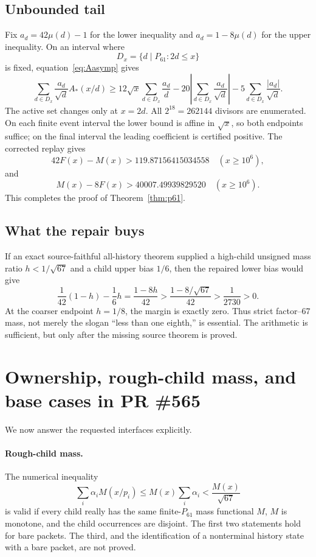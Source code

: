 \documentclass[11pt]{article}
\newcommand{\1}{\mathbf 1}
\newcommand{\Astar}{A_{\!*}}
\begin{document}
\subsection{Unbounded tail}

Fix $a_d=42\mu(d)-1$ for the lower inequality and $a_d=1-8\mu(d)$ for the upper inequality.  On an interval where
\[
D_x=\{d\mid P_{61}:2d\le x\}
\]
is fixed, equation~\eqref{eq:Aasymp} gives
\[
\sum_{d\in D_x}\frac{a_d}{\sqrt d}\Astar(x/d)
\ge12\sqrt x\sum_{d\in D_x}\frac{a_d}{d}
-20\left|\sum_{d\in D_x}\frac{a_d}{\sqrt d}\right|
-5\sum_{d\in D_x}\frac{|a_d|}{\sqrt d}.
\]
The active set changes only at $x=2d$.  All $2^{18}=262144$ divisors are enumerated.  On each finite event interval the lower bound is affine in $\sqrt x$, so both endpoints suffice; on the final interval the leading coefficient is certified positive.  The corrected replay gives
\[
42F(x)-M(x)>119.87156415034558
\quad(x\ge10^6),
\]
and
\[
M(x)-8F(x)>40007.49939829520
\quad(x\ge10^6).
\]
This completes the proof of Theorem~\ref{thm:p61}.

\subsection{What the repair buys}

If an exact source-faithful all-history theorem supplied a high-child unsigned mass ratio $h<1/\sqrt{67}$ and a child upper bias $1/6$, then the repaired lower bias would give
\[
\frac1{42}(1-h)-\frac16h
=\frac{1-8h}{42}>\frac{1-8/\sqrt{67}}{42}>\frac1{2730}>0.
\]
At the coarser endpoint $h=1/8$, the margin is exactly zero.  Thus strict factor--67 mass, not merely the slogan ``less than one eighth,'' is essential.  The arithmetic is sufficient, but only after the missing source theorem is proved.

\section{Ownership, rough-child mass, and base cases in PR \#565}

We now answer the requested interfaces explicitly.

\paragraph{Rough-child mass.}
The numerical inequality
\[
\sum_i\alpha_iM(x/p_i)\le M(x)\sum_i\alpha_i<\frac{M(x)}{\sqrt{67}}
\]
is valid if every child really has the same finite-$P_{61}$ mass functional $M$, $M$ is monotone, and the child occurrences are disjoint.  The first two statements hold for bare packets.  The third, and the identification of a nonterminal history state with a bare packet, are not proved.
\end{document}
